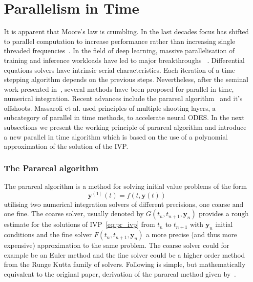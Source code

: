 \documentclass[11pt]{report}
\begin{document}
    \chapter{Parallelism in Time}
    It is apparent that Moore's law is crumbling.
    In the last decades focus has shifted to parallel computation to increase performance rather than increasing single
    threaded frequencies~\cite{theis2017end}.
    In the field of deep learning, massive parallelisation of training and inference workloads have led to major
    breakthroughs ~\cite{vaswani2017attention}.
    Differential equations solvers have intrinsic serial characteristics.
    Each iteration of a time stepping algorithm depends on the previous steps.
    Nevertheless, after the seminal work presented in~\cite{nievergelt1964parallel}, several methods have been proposed
    for parallel in time, numerical integration.
    Recent advances include the parareal algorithm~\cite{maday2002parareal} and it's offshoots.
    Massaroli et al. \cite{massaroli2021differentiable} used principles of multiple shooting layers,
    a subcategory of parallel in time methods, to accelerate neural ODES.
    In the next subsections we present the working principle of parareal algorithm and introduce a new parallel in
    time algorithm which is based on the use of a polynomial approximation of the solution of the IVP.

    \subsection{The Parareal algorithm}
    The parareal algorithm is a method for solving initial value problems of the form
    \begin{equation}
        \label{eq:pr_ivp}
        \pmb{y}^{(1)}(t) = f(t, \pmb{y}(t))
    \end{equation}
    utilising two numerical integration solvers of different precisions, one coarse and one fine.
    The coarse solver, usually denoted by $G(t_n, t_{n+1}, \pmb{y}_n)$ provides a rough estimate for the solutions of IVP~\eqref{eq:pr_ivp}
    from $t_n$ to $t_{n+1}$ with $\pmb{y}_n$ initial conditions and the fine solver $F(t_n, t_{n+1}, \pmb{y}_n)$ a more
    precise (and thus more expensive) approximation to the same problem.
    The coarse solver could for example be an Euler method and the fine solver could be a higher order method from the
    Runge Kutta family of solvers.
    Following is simple, but mathematically equivalent to the original paper, derivation of the parareal method given
    by~\cite{baffico2002parallel}.
\end{document}
